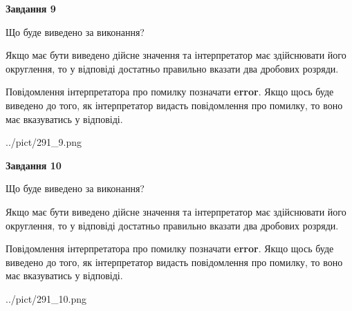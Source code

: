 \documentclass[12pt, ukrainian]{article}
\begin{document}
{\begin {Large}
{\begin {center}\textbf{Завдання 9}\end {center}}\par
Що буде виведено за виконання? \par

Якщо має бути виведено дійсне значення та інтерпретатор має здійснювати його округлення, 
то у відповіді достатньо правильно вказати два дробових розряди.

Повідомлення інтерпретатора про помилку позначати \textbf{error}.
Якщо щось буде виведено до того, як інтерпретатор видасть повідомлення про помилку, 
то воно має вказуватись у відповіді. \par

\begin{center}
	{../pict/291_9.png}
\end{center}
\newpage

{\begin {center}\textbf{Завдання 10}\end {center}}\par
Що буде виведено за виконання? \par

Якщо має бути виведено дійсне значення та інтерпретатор має здійснювати його округлення, 
то у відповіді достатньо правильно вказати два дробових розряди.

Повідомлення інтерпретатора про помилку позначати \textbf{error}.
Якщо щось буде виведено до того, як інтерпретатор видасть повідомлення про помилку, 
то воно має вказуватись у відповіді. \par

\begin{center}
	{../pict/291_10.png}
\end{center}
\newpage

\end {Large}}
\end{document}
